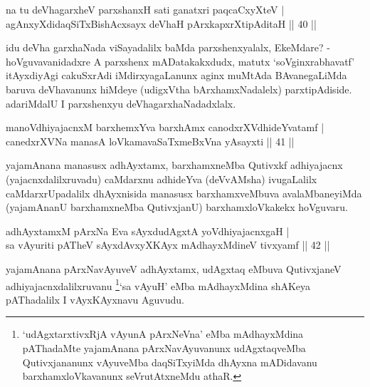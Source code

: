 
\begin{shl}
na tu deVhagarxheV parxshanxH sati ganatxri paqcaCxyXteV |\\
agAnxyXdidaqSiTxBishAcxsayx deVhaH pArxkapxrXtipAditaH \hfill || 40 ||
\end{shl}

\begin{artha}
idu deVha garxhaNada viSayadalilx baMda parxshenxyalalx, EkeMdare? - hoVguvavanidadxre A parxshenx mADatakakxdudx, matutx `soV\s ginxrabhavatf' itAyxdiyAgi cakuSxrAdi iMdirxyagaLanunx aginx muMtAda BAvanegaLiMda baruva deVhavanunx hiMdeye (udigxVtha bArxhamxNadalelx) parxtipAdiside. adariMdalU I parxshenxyu deVhagarxhaNadadxlalx.
\end{artha}


\begin{shl}
manoV\s dhiyajacnxM barxhemxYva barxhAmx canodxrXV\s dhideYvatamf |\\
canedxrXVNa manasA loVkamavaSaTxmeBxVna yAsayxti \hfill || 41 || 
\end{shl}

\begin{artha}
yajamAnana manasusx adhAyxtamx, barxhamxneMba Qutivxkf adhiyajacnx (yajacnxdalilxruvadu) caMdarxnu adhideYva (deVvAMsha) ivugaLalilx caMdarxrUpadalilx dhAyxnisida manasusx barxhamxveMbuva avalaMbaneyiMda (yajamAnanU barxhamxneMba QutivxjanU) barxhamxloVkakekx hoVguvaru.
\end{artha}

\begin{shl}
adhAyxtamxM pArxNa Eva sAyxdudAgxtA yoV\s dhiyajacnxgaH |\\
sa vAyuriti pATheV sAyxdAvxyXKAyx mAdhayxMdineV tivxyamf \hfill || 42 ||
\end{shl}

\begin{artha}
yajamAnana pArxNavAyuveV adhAyxtamx, udAgxtaq eMbuva QutivxjaneV adhiyajacnxdalilxruvanu \footnote{`udAgxtarxtivxRjA vAyunA pArxNeVna' eMba mAdhayxMdina pAThadaMte yajamAnana pArxNavAyuvanunx udAgxtaqveMba Qutivxjananunx vAyuveMba daqSiTxyiMda dhAyxna mADidavanu barxhamxloVkavanunx seVrutAtxneMdu athaR.}`sa vAyuH' eMba mAdhayxMdina shAKeya pAThadalilx I vAyxKAyxnavu Aguvudu.
\end{artha}


